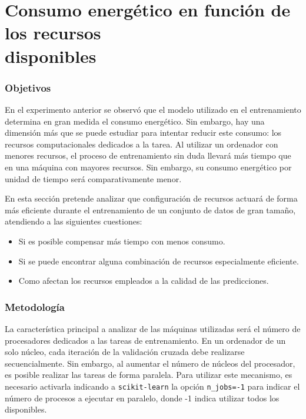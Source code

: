 \section{Consumo energético en función de los recursos\\ disponibles}
\label{sec:test-2-resources}

\subsubsection{Objetivos}

En el experimento anterior se observó que el modelo utilizado en el entrenamiento determina en gran medida el consumo energético. Sin embargo, hay una dimensión más que se puede estudiar para intentar reducir este consumo: los recursos computacionales dedicados a la tarea. Al utilizar un ordenador con menores recursos, el proceso de entrenamiento sin duda llevará más tiempo que en una máquina con mayores recursos. Sin embargo, su consumo energético por unidad de tiempo será comparativamente menor.
 
En esta sección pretende analizar que configuración de recursos actuará de forma más eficiente durante el entrenamiento de un conjunto de datos de gran tamaño, atendiendo a las siguientes cuestiones:

 \begin{itemize}
    \item Si es posible compensar más tiempo con menos consumo.
    \item Si se puede encontrar alguna combinación de recursos especialmente eficiente.
    \item Como afectan los recursos empleados a la calidad de las predicciones.
\end{itemize}

\subsubsection{Metodología}

La característica principal a analizar de las máquinas utilizadas será el número de procesadores dedicados a las tareas de entrenamiento. En un ordenador de un solo núcleo, cada iteración de la validación cruzada debe realizarse secuencialmente. Sin embargo, al aumentar el número de núcleos del procesador, es posible realizar las tareas de forma paralela. Para utilizar este mecanismo, es necesario activarla indicando a \texttt{scikit-learn} la opción \texttt{n\_jobs=-1} para indicar el número de procesos a ejecutar en paralelo, donde -1 indica utilizar todos los disponibles.

